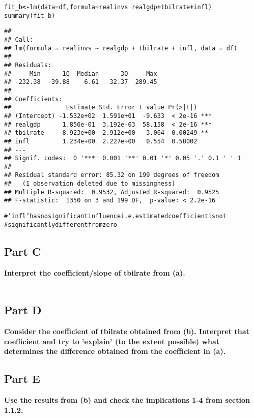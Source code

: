 \documentclass{article}\usepackage[]{graphicx}\usepackage[]{color}
\makeatletter
\newcommand{\hlcom}[1]{\textcolor[rgb]{1,0.502,0}{#1}}%
\newcommand{\hlopt}[1]{\textcolor[rgb]{1,0,0.502}{\textbf{#1}}}%
\newcommand{\hlstd}[1]{\textcolor[rgb]{0,0,0}{#1}}%
\newcommand{\hlkwb}[1]{\textcolor[rgb]{0.502,0.502,0.753}{\textbf{#1}}}%
\newcommand{\hlkwc}[1]{\textcolor[rgb]{0,0.502,0.753}{#1}}%
\newcommand{\hlkwd}[1]{\textcolor[rgb]{0,0.267,0.4}{#1}}%
\newenvironment{kframe}{%
 \def\at@end@of@kframe{}%
 \ifinner\ifhmode%
  \def\at@end@of@kframe{\end{minipage}}%
  \begin{minipage}{\columnwidth}%
 \fi\fi%
 \def\FrameCommand##1{\hskip\@totalleftmargin \hskip-\fboxsep
 \colorbox{shadecolor}{##1}\hskip-\fboxsep
     \hskip-\linewidth \hskip-\@totalleftmargin \hskip\columnwidth}%
 \MakeFramed {\advance\hsize-\width
   \@totalleftmargin\z@ \linewidth\hsize
   \@setminipage}}%
 {\par\unskip\endMakeFramed%
 \at@end@of@kframe}
\newenvironment{knitrout}{}{} %
\newcommand{\1}{\mathbb{1}}
\makeatother
\begin{document}
\begin{knitrout}
\color{fgcolor}\begin{kframe}
\begin{alltt}
\hlstd{fit_b} \hlkwb{<-} \hlkwd{lm}\hlstd{(}\hlkwc{data} \hlstd{= df,} \hlkwc{formula} \hlstd{= realinvs} \hlopt{~} \hlstd{realgdp} \hlopt{+} \hlstd{tbilrate} \hlopt{+} \hlstd{infl)}
\hlkwd{summary}\hlstd{(fit_b)}
\end{alltt}
\begin{verbatim}
## 
## Call:
## lm(formula = realinvs ~ realgdp + tbilrate + infl, data = df)
## 
## Residuals:
##     Min      1Q  Median      3Q     Max 
## -232.38  -39.88    6.61   32.37  289.45 
## 
## Coefficients:
##               Estimate Std. Error t value Pr(>|t|)    
## (Intercept) -1.532e+02  1.591e+01  -9.633  < 2e-16 ***
## realgdp      1.856e-01  3.192e-03  58.158  < 2e-16 ***
## tbilrate    -8.923e+00  2.912e+00  -3.064  0.00249 ** 
## infl         1.234e+00  2.227e+00   0.554  0.58002    
## ---
## Signif. codes:  0 '***' 0.001 '**' 0.01 '*' 0.05 '.' 0.1 ' ' 1
## 
## Residual standard error: 85.32 on 199 degrees of freedom
##   (1 observation deleted due to missingness)
## Multiple R-squared:  0.9532,	Adjusted R-squared:  0.9525 
## F-statistic:  1350 on 3 and 199 DF,  p-value: < 2.2e-16
\end{verbatim}
\begin{alltt}
\hlcom{# 'infl' has no significant influence i.e. estimated coefficient is not }
\hlcom{# significantly different from zero}
\end{alltt}
\end{kframe}
\end{knitrout}


\subsection*{Part C}
\textbf{Interpret the coefficient/slope of tbilrate from (a).}\\\\

\subsection*{Part D}
\textbf{Consider the coefficient of tbilrate obtained from (b). Interpret that coefficient and try to 'explain' (to the extent possible) what determines the difference obtained from the coefficient in (a).}



\subsection*{Part E}
\textbf{Use the results from (b) and check the implications 1-4 from section 1.1.2.}
\end{document}
